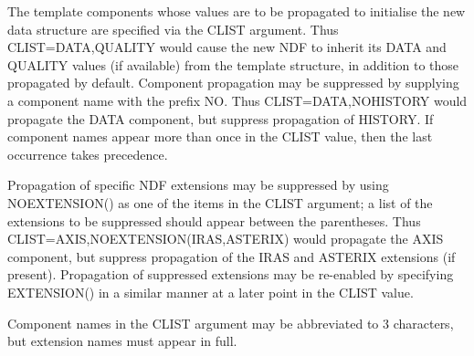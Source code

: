 {{{         \sstitem
         The template components whose values are to be propagated to
         initialise the new data structure are specified via the CLIST
         argument. Thus CLIST=DATA,QUALITY would cause the new NDF to
         inherit its DATA and QUALITY values (if available) from the
         template structure, in addition to those propagated by default.
         Component propagation may be suppressed by supplying a component
         name with the prefix NO. Thus CLIST=DATA,NOHISTORY would
         propagate the DATA component, but suppress propagation of
         HISTORY. If component names appear more than once in the CLIST
         value, then the last occurrence takes precedence.

         \sstitem
         Propagation of specific NDF extensions may be suppressed by
         using NOEXTENSION() as one of the items in the CLIST argument;
         a list of the extensions to be suppressed should appear between
         the parentheses. Thus CLIST=AXIS,NOEXTENSION(IRAS,ASTERIX)
         would propagate the AXIS component, but suppress propagation of
         the IRAS and ASTERIX extensions (if present). Propagation of
         suppressed extensions may be re-enabled by specifying
         EXTENSION() in a similar manner at a later point in the CLIST
         value.

         \sstitem
         Component names in the CLIST argument may be abbreviated to 3
         characters, but extension names must appear in full.
      }
   }
}
